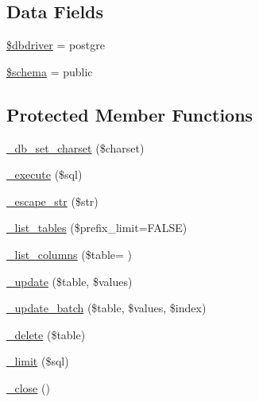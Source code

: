 \subsection*{Data Fields}
\begin{DoxyCompactItemize}
\item 
\hyperlink{class_c_i___d_b__postgre__driver_a0cde2a16322a023d040aa7f725877597}{\$dbdriver} = \textquotesingle{}postgre\textquotesingle{}
\item 
\hyperlink{class_c_i___d_b__postgre__driver_a83022b1d70799d2bde3d64dca9cb40ee}{\$schema} = \textquotesingle{}public\textquotesingle{}
\end{DoxyCompactItemize}
\subsection*{Protected Member Functions}
\begin{DoxyCompactItemize}
\item 
\hyperlink{class_c_i___d_b__postgre__driver_a2b808d420d8e9fea0b73ad7127f5efb8}{\+\_\+db\+\_\+set\+\_\+charset} (\$charset)
\item 
\hyperlink{class_c_i___d_b__postgre__driver_a114ab675d89bf8324a41785fb475e86d}{\+\_\+execute} (\$sql)
\item 
\hyperlink{class_c_i___d_b__postgre__driver_af8ef0237bfcdb19215b63fff769e7a55}{\+\_\+escape\+\_\+str} (\$str)
\item 
\hyperlink{class_c_i___d_b__postgre__driver_a435c0f3ce54fe7daa178baa8532ebd54}{\+\_\+list\+\_\+tables} (\$prefix\+\_\+limit=F\+A\+L\+S\+E)
\item 
\hyperlink{class_c_i___d_b__postgre__driver_a2a81bb476a5c76fe6f763b0557c1e4c2}{\+\_\+list\+\_\+columns} (\$table= \textquotesingle{}\textquotesingle{})
\item 
\hyperlink{class_c_i___d_b__postgre__driver_a2540b03a93fa73ae74c10d0e16fc073e}{\+\_\+update} (\$table, \$values)
\item 
\hyperlink{class_c_i___d_b__postgre__driver_a336b9ebb119e47b6a84bb7fc9d4dae93}{\+\_\+update\+\_\+batch} (\$table, \$values, \$index)
\item 
\hyperlink{class_c_i___d_b__postgre__driver_a133ea8446ded52589bd22cc9163d0896}{\+\_\+delete} (\$table)
\item 
\hyperlink{class_c_i___d_b__postgre__driver_a3a02ea06541b8ecc25a33a61651562c8}{\+\_\+limit} (\$sql)
\item 
\hyperlink{class_c_i___d_b__postgre__driver_a4d9082658000e5ede8312067c6dda9db}{\+\_\+close} ()
\end{DoxyCompactItemize}
